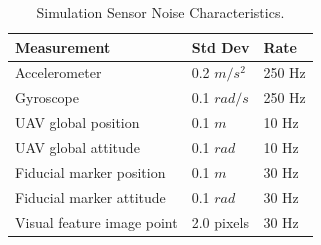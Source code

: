 \begin{table}[h!]
  \begin{center}
    \caption{Simulation Sensor Noise Characteristics.}
    \label{tab:sim_meas_noise}
    \begin{tabular}{l|l|l}
      \textbf{Measurement} & \textbf{Std Dev} & \textbf{Rate} \\
      \hline
      Accelerometer & 0.2 $m/s^2$ & 250 Hz \\
      Gyroscope & 0.1 $rad/s$ & 250 Hz \\
      UAV global position & 0.1 $m$ & 10 Hz \\
      UAV global attitude & 0.1 $rad$ & 10 Hz \\
      Fiducial marker position & 0.1 $m$ & 30 Hz \\
      Fiducial marker attitude & 0.1 $rad$ & 30 Hz \\
      Visual feature image point & 2.0 pixels & 30 Hz \\
    \end{tabular}
  \end{center}
\end{table}

